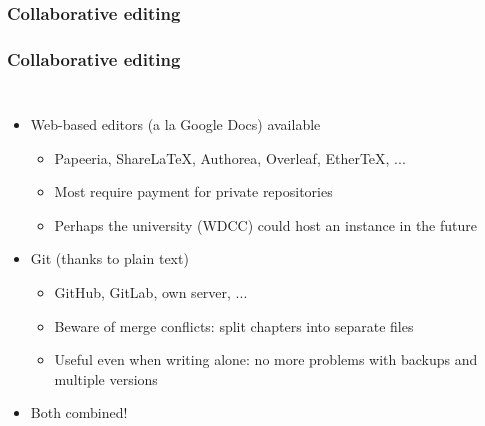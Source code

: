 \documentclass[xetex,colorlinks]{beamer} %
\begin{document}
  \subsubsection{Collaborative editing}
  \begin{frame}
    \frametitle{Collaborative editing}
    \begin{columns}
      \begin{itemize}
	\item Web-based editors (a la Google Docs) available
	\begin{itemize}
	  \item Papeeria, ShareLaTeX, Authorea, Overleaf, EtherTeX, ...
	  \item Most require payment for private repositories
	  \item Perhaps the university (WDCC) could host an instance in the future
	\end{itemize}
	\item Git (thanks to plain text)
	\begin{itemize}
	  \item GitHub, GitLab, own server, ...
	  \item Beware of merge conflicts: split chapters into separate files
	  \item Useful even when writing alone: no more problems with backups and multiple versions
	\end{itemize}
	\item Both combined!
      \end{itemize}
      
    \end{columns}
  \end{frame}
  
\end{document}
